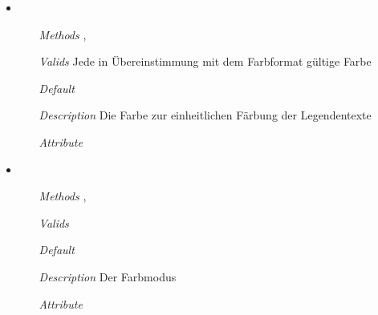 \begin{itemize}
\item {}
\begin{enumerate}
\item[\textit{Methods}] , 
\item[\textit{Valids}] Jede in \"Ubereinstimmung mit dem Farbformat
  g\"ultige Farbe
\item[\textit{Default}] 
\item[\textit{Description}] Die Farbe zur einheitlichen F\"arbung der
  Legendentexte
\item[\textit{Attribute}] 
\end{enumerate}

\item {}
\begin{enumerate}
\item[\textit{Methods}] ,
\item[\textit{Valids}] 
\item[\textit{Default}] 
\item[\textit{Description}] Der Farbmodus
\item[\textit{Attribute}] 
\end{enumerate}

\end{itemize}


\newpage

